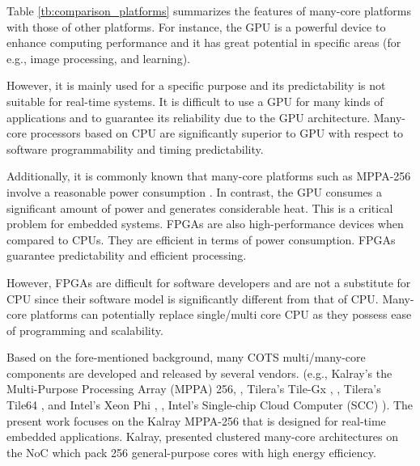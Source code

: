 \documentclass[conference,compsoc]{IEEEtran}
\newcommand{\comment}[1]{}
\begin{document}

Table \ref{tb:comparison_platforms} summarizes the features of many-core platforms with those of other platforms.
For instance, the GPU is a powerful device to enhance computing performance and it has great potential in specific areas (for e.g., image processing, and learning).
\comment{1-24}
However, it is mainly used for a specific purpose and its predictability is not suitable for real-time systems.
It is difficult to use a GPU for many kinds of applications and to guarantee its reliability due to the GPU architecture.
Many-core processors based on CPU are significantly superior to GPU with respect to software programmability and timing predictability.
\comment{1-25}
Additionally, it is commonly known that many-core platforms such as MPPA-256 involve a reasonable power consumption \cite{kanter2015kalray}.
In contrast, the GPU consumes a significant amount of power and generates considerable heat.
This is a critical problem for embedded systems.
FPGAs are also high-performance devices when compared to CPUs.
They are efficient in terms of power consumption.
FPGAs guarantee predictability and efficient processing.
\comment{1-26}
However, FPGAs are difficult for software developers and are not a substitute for CPU since their software model is significantly different from that of CPU.
Many-core platforms can potentially replace single/multi core CPU as they possess ease of programming and scalability.

Based on the fore-mentioned background, many COTS multi/many-core components are developed and released by several vendors.
(e.g., Kalray's the Multi-Purpose Processing Array (MPPA) 256, \cite{de2014time}, Tilera's Tile-Gx \cite{ramey2011tile}, \cite{schooler2010tile}, Tilera's Tile64 \cite{bell2008tile64}, and Intel's Xeon Phi \cite{chrysos2014intel}, \cite{chrysos2012intel}, Intel's Single-chip Cloud Computer (SCC) \cite{baron2010single}).
The present work focuses on the Kalray MPPA-256 that is designed for real-time embedded applications.
Kalray, \cite{de2014time} presented clustered many-core architectures on the NoC which pack 256 general-purpose cores with high energy efficiency.
\end{document}
